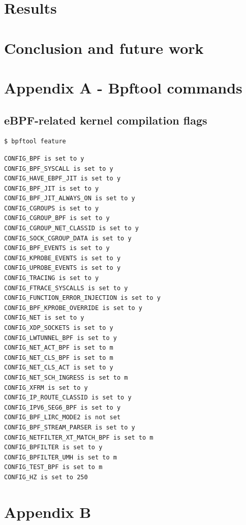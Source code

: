 \documentclass[12pt]{report} %
\begin{document}
\chapter{Results}


\chapter{Conclusion and future work}






\clearpage
{}

\printbibliography




%



\chapter* {Appendix A - Bpftool commands} \label{annex:bpftool_flags_kernel}
\section*{eBPF-related kernel compilation flags} 
\begin{lstlisting}[language=bash]
$ bpftool feature
\end{lstlisting}

\begin{verbatim}
CONFIG_BPF is set to y
CONFIG_BPF_SYSCALL is set to y
CONFIG_HAVE_EBPF_JIT is set to y
CONFIG_BPF_JIT is set to y
CONFIG_BPF_JIT_ALWAYS_ON is set to y
CONFIG_CGROUPS is set to y
CONFIG_CGROUP_BPF is set to y
CONFIG_CGROUP_NET_CLASSID is set to y
CONFIG_SOCK_CGROUP_DATA is set to y
CONFIG_BPF_EVENTS is set to y
CONFIG_KPROBE_EVENTS is set to y
CONFIG_UPROBE_EVENTS is set to y
CONFIG_TRACING is set to y
CONFIG_FTRACE_SYSCALLS is set to y
CONFIG_FUNCTION_ERROR_INJECTION is set to y
CONFIG_BPF_KPROBE_OVERRIDE is set to y
CONFIG_NET is set to y
CONFIG_XDP_SOCKETS is set to y
CONFIG_LWTUNNEL_BPF is set to y
CONFIG_NET_ACT_BPF is set to m
CONFIG_NET_CLS_BPF is set to m
CONFIG_NET_CLS_ACT is set to y
CONFIG_NET_SCH_INGRESS is set to m
CONFIG_XFRM is set to y
CONFIG_IP_ROUTE_CLASSID is set to y
CONFIG_IPV6_SEG6_BPF is set to y
CONFIG_BPF_LIRC_MODE2 is not set
CONFIG_BPF_STREAM_PARSER is set to y
CONFIG_NETFILTER_XT_MATCH_BPF is set to m
CONFIG_BPFILTER is set to y
CONFIG_BPFILTER_UMH is set to m
CONFIG_TEST_BPF is set to m
CONFIG_HZ is set to 250
\end{verbatim}


\chapter* {Appendix B}
\end{document}
